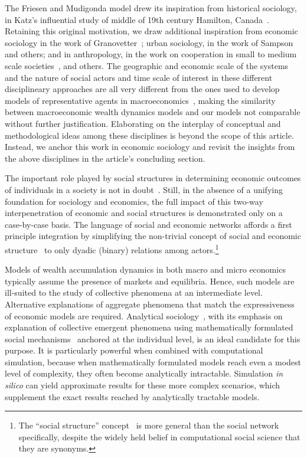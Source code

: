 The Friesen and Mudigonda model drew its inspiration from historical sociology, in Katz's influential study of middle of 19th century Hamilton, Canada~\cite{katz2013people}. Retaining this original motivation, we draw additional inspiration from economic sociology in the work of Granovetter~\cite{granovetter2005}; urban sociology, in the work of Sampson~\cite{sampson2002} and others; and in anthropology, in the work on cooperation in small to medium scale societies~\cite{avner1994,white2011kinship}, and others. The geographic and economic scale of the systems and the nature of social actors and time scale of interest in these different disciplineary approaches are all very different from the ones used to develop models of representative agents in macroeconomics~\cite{benhabib2018}, making the similarity between macroeconomic wealth dynamics models and our models not comparable without further justification. Elaborating on the interplay of conceptual and methodological ideas among these disciplines is beyond the scope of this article. Instead, we anchor this work in economic sociology and revisit the insights from the above disciplines in the article's concluding section.

The important role played by social structures in determining economic outcomes of individuals in a society is not in doubt~\cite{granovetter2005, jackson_rev2017}. Still, in the absence of a unifying foundation for sociology and economics, the full impact of this two-way interpenetration of economic and social structures is demonstrated only on a case-by-case basis. The language of social and economic networks affords a first principle integration by simplifying the non-trivial concept of social and economic structure~\cite{martin_lee} to only dyadic (binary) relations among actors.\footnote{The ``social structure'' concept~\cite{martin_lee} is more general than the social network specifically, despite the widely held belief in computational social science that they are synonyms.}

Models of wealth accumulation dynamics in both macro and micro economics typically assume the presence of markets and equilibria. Hence, such models are ill-suited to the study of collective phenomena at an intermediate level. Alternative explanations of aggregate phenomena that match the expressiveness of economic models are required. Analytical sociology~\cite{ch1as_hdbk}, with its emphasis on explanation of collective emergent phenomena using mathematically formulated social mechanisms~\cite{ch2as_hdbk,ch11as_hdbk} anchored at the individual level, is an ideal candidate for this purpose. It is particularly powerful when combined with computational simulation, because when mathematically formulated models reach even a modest level of complexity, they often become analytically intractable. Simulation \textit{in silico} can yield approximate results for these more complex scenarios, which supplement the exact results reached by analytically tractable models. 

